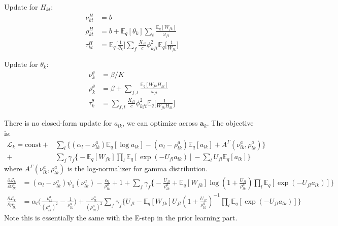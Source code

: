 \documentclass{article}
\begin{document}
Update for $H_{kt}$:
\begin{align*}
\nu_{kt}^H &= b\\
\rho_{kt}^H &= b + \mathbb{E}_q[\theta_k] \sum_t \frac{\mathbb{E}_q[W_{fk}]}{\omega_{ft}}\\
\tau_{kt}^H &= \mathbb{E}_q\biggl[\frac{1}{\theta_k}\biggl]\sum_f \frac{X_{ft}}{c} \phi_{kft}^2 \mathbb{E}_q \biggl[\frac{1}{W_{fk}}\biggl]
\end{align*}

Update for $\theta_k$:
\begin{align*}
\nu_k^{\theta} &= \beta/K\\
\rho_k^{\theta} &= \beta + \sum_{f,t} \frac{\mathbb{E}_q[W_{fk}H_{kt}]}{\omega_{ft}}\\
\tau_k^{\theta} &= \sum_{f, t} \frac{X_{ft}}{c} \phi_{kft}^2 \mathbb{E}_q\biggl[\frac{1}{W_{fk}H_{kt}}\biggl]
\end{align*}

There is no closed-form update for $a_{lk}$, we can optimize across $\bm{a}_k$. The objective is: 
\begin{align*}
\mathcal{L}_k = \text{const} +& \sum_l \biggl\{(\alpha_l - \nu_{lk}^a) \mathbb{E}_q [\log a_{lk}] - (\alpha_l - \rho_{lk}^a) \mathbb{E}_q[a_{lk}] + A^{\Gamma}(\nu_{lk}^a, \rho_{lk}^a) \biggl\} \\
+&\sum_f  \gamma_f \biggl\{ -\mathbb{E}_q[W_{fk}] \prod_l \mathbb{E}_q[\exp(-U_{fl} a_{lk})] -  \sum_l U_{fl} \mathbb{E}_q[a_{lk}] \biggl\}
\end{align*}
where $A^{\Gamma}(\nu_{lk}^a, \rho_{lk}^a)$ is the log-normalizer for gamma distribution.
\begin{align*}
\frac{\partial \mathcal{L}_k}{\partial \nu_{lk}^a} &= (\alpha_l - \nu_{lk}^a) \psi_1 (\nu_{lk}^a) - \frac{\alpha_l}{\rho_{lk}^a} + 1 + \sum_f \gamma_f \biggl\{-\frac{ U_{fl} }{\rho_{lk}^a}  + \mathbb{E}_q[W_{fk}] \log(1 + \frac{U_{fl}}{\rho_{lk}^a}) \prod_l \mathbb{E}_q[\exp(-U_{fl} a_{lk})] \biggl\}\\
\frac{\partial \mathcal{L}_k}{\partial \rho_{lk}^a} &= \alpha_l \Big(\frac{\nu_{lk}^a}{(\rho_{lk}^a)^2} - \frac{1}{\rho_{lk}^a}\Big) + \frac{\nu_{lk}^a}{(\rho_{lk}^a)^2}\sum_f \gamma_f \biggl\{ U_{fl} - \mathbb{E}_q[W_{fk}] U_{fl} (1 + \frac{U_{fl}}{\rho_{lk}^a})^{-1}  \prod_l \mathbb{E}_q[\exp(-U_{fl} a_{lk})] \biggl\}
\end{align*}
Note this is essentially the same with the E-step in the prior learning part.
\end{document}
